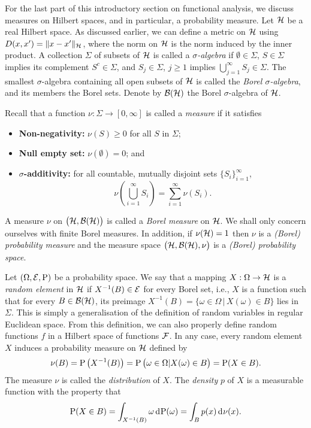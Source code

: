 For the last part of this introductory section on functional analysis, we discuss measures on Hilbert spaces, and in particular, a probability measure.
Let ${\mathcal H}$ be a real Hilbert space. 
As discussed earlier, we can define a metric on ${\mathcal H}$ using $D(x,x') = \lVert x-x'\rVert_{\mathcal H}$, where the norm on ${\mathcal H}$ is the norm induced by the inner product.
A collection $\Sigma$ of subsets of ${\mathcal H}$ is called a \emph{$\sigma$-algebra} if $\emptyset \in \Sigma$, $S \in \Sigma$ implies its complement $S^c \in \Sigma$, and $S_j\in\Sigma$, $j\geq 1$ implies $\bigcup_{j=1}^\infty S_j \in \Sigma$.
The smallest $\sigma$-algebra containing all open subsets of ${\mathcal H}$ is called the \emph{Borel $\sigma$-algebra}, and its members the Borel sets.
Denote by ${\mathcal B}({\mathcal H})$ the Borel $\sigma$-algebra of ${\mathcal H}$.

Recall that a function $\nu:\Sigma\to[0,\infty]$ is called a \emph{measure} if it satisfies
\begin{itemize}
  \item \textbf{Non-negativity:} $\nu(S) \geq 0$ for all $S$ in $\Sigma$;
  \item \textbf{Null empty set:} $\nu(\emptyset) = 0$; and
  \item \textbf{$\sigma$-additivity:} for all countable, mutually disjoint sets $\{S_i\}_{i=1}^\infty$,
  \[
    \nu\left(\bigcup_{i=1}^\infty S_i \right) = \sum_{i=1}^\infty \nu(S_i).
  \] 
\end{itemize}
A measure $\nu$ on $\big({\mathcal H},{\mathcal B}({\mathcal H})\big)$ is called a \emph{Borel measure} on ${\mathcal H}$.
We shall only concern ourselves with finite Borel measures. 
In addition, if $\nu({\mathcal H}) = 1$ then $\nu$ is a \emph{(Borel) probability measure} and the measure space $\big({\mathcal H},{\mathcal B}({\mathcal H}),\nu\big)$ is a \emph{(Borel) probability space}.

Let $(\Omega,{\mathcal E},\operatorname{P})$ be a probability space.
We say that a mapping $X:\Omega\to{\mathcal H}$ is a \emph{random element} in ${\mathcal H}$ if $X^{-1}(B)\in{\mathcal E}$ for every Borel set, i.e., $X$ is a function such that for every $B\in{\mathcal B}({\mathcal H})$, its preimage $X^{-1}(B) = \{\omega \in \Omega \,|\, X(\omega) \in B \}$ lies in $\Sigma$.
This is simply a generalisation of the definition of random variables in regular Euclidean space.
From this definition, we can also properly define random functions $f$ in a Hilbert space of functions ${\mathcal F}$.
In any case, every random element $X$ induces a probability measure on ${\mathcal H}$ defined by
\[
  \nu(B) = \operatorname{P}\big(X^{-1}(B)\big) = \operatorname{P}\big( \omega \in \Omega | X(\omega) \in B  \big) = \operatorname{P}(X \in B).
\]
The measure $\nu$ is called the \emph{distribution} of $X$.
The \emph{density} $p$ of $X$ is a measurable function with the property that
\[
  \operatorname{P}(X \in B) = \int_{X^{-1}(B)} \omega \operatorname{d}\hspace{0.5pt}\!\operatorname{P}(\omega) = \int_B p(x) \operatorname{d}\hspace{0.5pt}\!\nu(x).
\]


